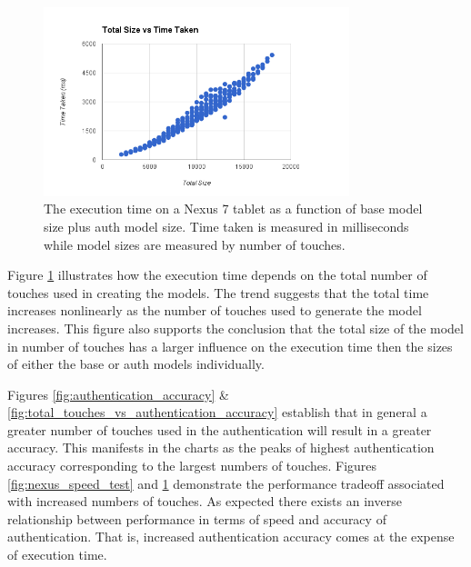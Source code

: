 \documentclass{acm_proc_article-sp}
\begin{document}
\begin{figure}
\centering
\includegraphics[width=3.5in]{nexus_total_size_time.png}
\caption{The execution time  on a Nexus 7 tablet as a function of base model size plus auth model size. Time taken is measured in milliseconds while model sizes are measured by number of touches.}
\label{fig:nexus_total_size_time}
\end{figure}

Figure \ref{fig:nexus_total_size_time} illustrates how the execution time depends on the total number of touches used in creating the models. The trend suggests that the total  time  increases 
nonlinearly as the number of touches used to generate the model increases.
This figure also supports the conclusion that the total size of the model in number of touches has a larger influence on the execution time then the sizes of either the base or auth models individually.

Figures \ref{fig:authentication_accuracy}  \& \ref{fig:total_touches_vs_authentication_accuracy} establish that in general a greater number of touches used in the authentication will result in a greater accuracy. This manifests in the charts as the peaks of highest authentication accuracy  
corresponding to the largest numbers of touches. Figures \ref{fig:nexus_speed_test} and \ref{fig:nexus_total_size_time} demonstrate the performance tradeoff associated with increased numbers of touches. 
As expected there exists an inverse relationship between performance in terms of speed and accuracy of authentication. That is, increased authentication accuracy comes at the expense of execution time.
\end{document}
